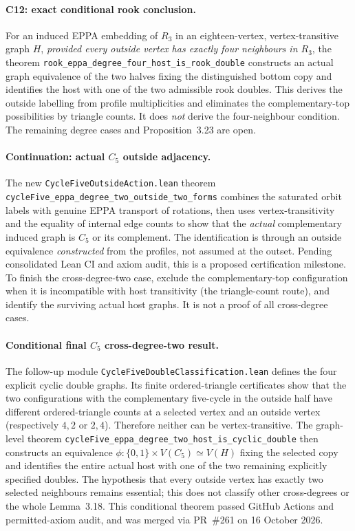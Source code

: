 \documentclass[11pt,a4paper]{article}
\begin{document}
\paragraph{C12: exact conditional rook conclusion.}
For an induced EPPA embedding of \(R_3\) in an eighteen-vertex,
vertex-transitive graph \(H\), \emph{provided every outside
vertex has exactly four neighbours in \(R_3\)}, the theorem
\texttt{rook\_eppa\_degree\_four\_host\_is\_rook\_double}
constructs an actual graph equivalence of the two halves
fixing the distinguished bottom copy and identifies the host
with one of the two admissible rook doubles. This derives the
outside labelling from profile multiplicities and eliminates
the complementary-top possibilities by triangle counts.
It does \emph{not} derive the four-neighbour condition.
The remaining degree cases and Proposition~3.23 are open.

\paragraph{Continuation: actual \(C_5\) outside adjacency.}
The new \texttt{CycleFiveOutsideAction.lean} theorem
\texttt{cycleFive\_eppa\_degree\_two\_outside\_two\_forms}
combines the saturated orbit labels with genuine
EPPA transport of rotations, then uses
vertex-transitivity and the equality of internal
edge counts to show that the \emph{actual}
complementary induced graph is \(C_5\) or its
complement. The identification is through an
outside equivalence \emph{constructed} from the
profiles, not assumed at the outset.
Pending consolidated Lean CI and axiom audit,
this is a proposed certification milestone.
To finish the cross-degree-two case, exclude
the complementary-top configuration when it
is incompatible with host transitivity (the
triangle-count route), and identify the
surviving actual host graphs. It is not a
proof of all cross-degree cases.

\paragraph{Conditional final \(C_5\) cross-degree-two result.}
The follow-up module \texttt{CycleFiveDoubleClassification.lean}
defines the four explicit cyclic double graphs. Its finite
ordered-triangle certificates show that the two configurations
with the complementary five-cycle in the outside half have
different ordered-triangle counts at a selected vertex and
an outside vertex (respectively \(4,2\) or \(2,4\)).
Therefore neither can be vertex-transitive.
The graph-level theorem
\texttt{cycleFive\_eppa\_degree\_two\_host\_is\_cyclic\_double}
then constructs an equivalence
\(\phi:\{0,1\}\times V(C_5)\simeq V(H)\) fixing the selected
copy and identifies the entire actual host with one of the
two remaining explicitly specified doubles.
The hypothesis that every outside vertex has exactly two
selected neighbours remains essential; this does not
classify other cross-degrees or the whole Lemma~3.18.
This conditional theorem passed GitHub Actions and permitted-axiom
audit, and was merged via PR~\#261 on 16 October 2026.
\end{document}
